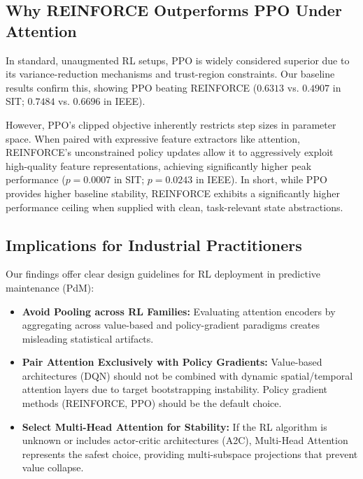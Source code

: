\documentclass[sn-basic]{sn-jnl}%
\begin{document}
\subsection{Why \textsc{REINFORCE} Outperforms \textsc{PPO} Under Attention}
In standard, unaugmented RL setups, \textsc{PPO} is widely considered superior due to its variance-reduction mechanisms and trust-region constraints. Our baseline results confirm this, showing \textsc{PPO} beating \textsc{REINFORCE} ($0.6313$ vs. $0.4907$ in SIT; $0.7484$ vs. $0.6696$ in IEEE). 

However, \textsc{PPO}'s clipped objective inherently restricts step sizes in parameter space. When paired with expressive feature extractors like attention, \textsc{REINFORCE}'s unconstrained policy updates allow it to aggressively exploit high-quality feature representations, achieving significantly higher peak performance ($p = 0.0007$ in SIT; $p = 0.0243$ in IEEE). In short, while \textsc{PPO} provides higher baseline stability, \textsc{REINFORCE} exhibits a significantly higher performance ceiling when supplied with clean, task-relevant state abstractions.

\subsection{Implications for Industrial Practitioners}
Our findings offer clear design guidelines for RL deployment in predictive maintenance (PdM):
\begin{itemize}
    \item \textbf{Avoid Pooling across RL Families:} Evaluating attention encoders by aggregating across value-based and policy-gradient paradigms creates misleading statistical artifacts. 
    \item \textbf{Pair Attention Exclusively with Policy Gradients:} Value-based architectures (\textsc{DQN}) should not be combined with dynamic spatial/temporal attention layers due to target bootstrapping instability. Policy gradient methods (\textsc{REINFORCE}, \textsc{PPO}) should be the default choice.
    \item \textbf{Select Multi-Head Attention for Stability:} If the RL algorithm is unknown or includes actor-critic architectures (\textsc{A2C}), Multi-Head Attention represents the safest choice, providing multi-subspace projections that prevent value collapse.
\end{itemize}

\end{document}
